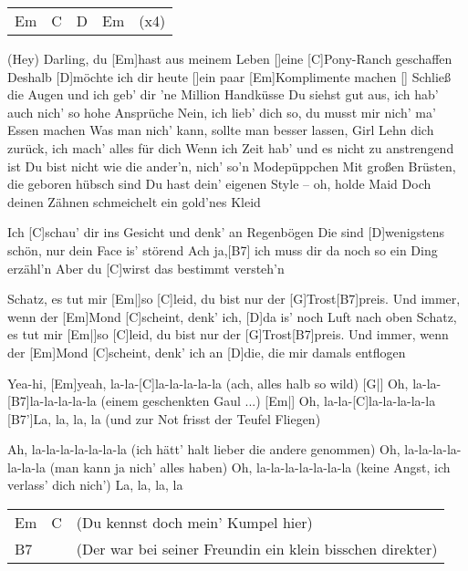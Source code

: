 



\begin{guitar}
	{\footnotesize\begin{tabular}{l|l|l|l l}
			Em \optionalChord{B} & C & D \optionalChord{G} & Em \optionalChord{D} & (x4)
	\end{tabular}}

	\songsection{Strophe 1}
	(Hey) Darling, du [Em]hast aus meinem Leben []eine [C]Pony-Ranch geschaffen
	Deshalb [D]möchte ich dir heute []ein paar [Em]Komplimente machen []{}
	Schließ die Augen und ich geb' dir 'ne Million Handküsse
	Du siehst gut aus, ich hab' auch nich' so hohe Ansprüche
	Nein, ich lieb' dich so, du musst mir nich' ma' Essen machen
	Was man nich' kann, sollte man besser lassen, Girl
	Lehn dich zurück, ich mach' alles für dich
	Wenn ich Zeit hab' und es nicht zu anstrengend ist
	Du bist nicht wie die ander'n, nich' so'n Modepüppchen
	Mit großen Brüsten, die geboren hübsch sind
	Du hast dein' eigenen Style – oh, holde Maid
	Doch deinen Zähnen schmeichelt ein gold'nes Kleid
	
	Ich [C]schau' dir ins Gesicht und denk' an Regenbögen
	Die sind [D]wenigstens schön, nur dein Face is' störend
	Ach ja,[B7] ich muss dir da noch so ein Ding erzähl'n
	Aber du [C]wirst das bestimmt versteh'n
	
	Schatz, es tut mir [Em|]{so }[C]leid, du bist nur der [G]Trost[B7]preis.
	Und immer, wenn der [Em]Mond [C]scheint, denk' ich, [D]da is' noch Luft nach oben
	Schatz, es tut mir [Em|]{so }[C]leid, du bist nur der [G]Trost[B7]preis.
	Und immer, wenn der [Em]Mond [C]scheint, denk' ich an [D]die, die mir damals entflogen
	
	\pagebreak
	Yea-hi, [Em]yeah, la-la-[C]la-la-la-la-la (ach, alles halb so wild)
	[G|] Oh, la-la-[B7]la-la-la-la-la (einem geschenkten Gaul ...)
	[Em|] Oh, la-la-[C]la-la-la-la-la
	[B7']La, la, la, la (und zur Not frisst der Teufel Fliegen)
	
	Ah, la-la-la-la-la-la-la (ich hätt' halt lieber die andere genommen)
	Oh, la-la-la-la-la-la-la (man kann ja nich' alles haben)
	Oh, la-la-la-la-la-la-la (keine Angst, ich verlass' dich nich')
	La, la, la, la
	{\footnotesize\begin{tabular}{l|l l}
			Em & C & {\small(Du kennst doch mein' Kumpel hier)} \\
			B7 & & {\small(Der war bei seiner Freundin ein klein bisschen direkter)}
	\end{tabular}}
	

\end{guitar}
